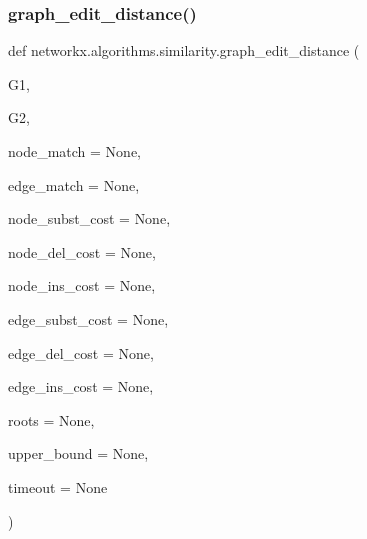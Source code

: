 \subsubsection{\texorpdfstring{graph\+\_\+edit\+\_\+distance()}{graph\_edit\_distance()}}
{\footnotesize\ttfamily def networkx.\+algorithms.\+similarity.\+graph\+\_\+edit\+\_\+distance (\begin{DoxyParamCaption}\item[{}]{G1,  }\item[{}]{G2,  }\item[{}]{node\+\_\+match = {\ttfamily None},  }\item[{}]{edge\+\_\+match = {\ttfamily None},  }\item[{}]{node\+\_\+subst\+\_\+cost = {\ttfamily None},  }\item[{}]{node\+\_\+del\+\_\+cost = {\ttfamily None},  }\item[{}]{node\+\_\+ins\+\_\+cost = {\ttfamily None},  }\item[{}]{edge\+\_\+subst\+\_\+cost = {\ttfamily None},  }\item[{}]{edge\+\_\+del\+\_\+cost = {\ttfamily None},  }\item[{}]{edge\+\_\+ins\+\_\+cost = {\ttfamily None},  }\item[{}]{roots = {\ttfamily None},  }\item[{}]{upper\+\_\+bound = {\ttfamily None},  }\item[{}]{timeout = {\ttfamily None} }\end{DoxyParamCaption})}

